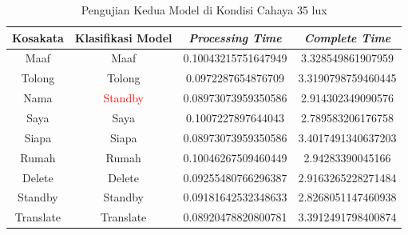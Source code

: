 \begin{longtable}{|c|c|c|c|}
  \caption{Pengujian Kedua Model di Kondisi Cahaya 35 lux}
  \label{tb:prediksigelap2}                                   \\
  \hline
  \rowcolor[HTML]{C0C0C0}
  \textbf{Kosakata} & \textbf{Klasifikasi Model} & \textbf{\emph{Processing Time}} & \textbf{\emph{Complete Time}} \\
  \hline
  Maaf              & Maaf                        & 0.10043215751647949                           & 3.328549861907959                                  \\
  Tolong            & Tolong                        & 0.0972287654876709                           & 3.3190798759460445                                  \\
  Nama              & \textcolor{red}{Standby}                        & 0.08973073959350586                           & 2.914302349090576                                  \\
  Saya              & Saya                        & 0.1007227897644043                           & 2.789583206176758                                  \\
  Siapa              & Siapa                        & 0.08973073959350586                           & 3.4017491340637203                                  \\
  Rumah             & Rumah                        & 0.10046267509460449                           & 2.94283390045166                                  \\
  Delete            & Delete                        & 0.09255480766296387                           & 2.9163265228271484                                  \\
  Standby           & Standby                        & 0.09181642532348633                           & 2.8268051147460938                                  \\
  Translate         & Translate                        & 0.08920478820800781                           & 3.3912491798400874                                  \\
  \hline
\end{longtable}

